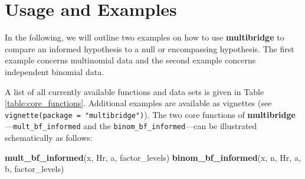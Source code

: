 \documentclass[
  english,
  man,floatsintext]{apa6}
\newenvironment{Shaded}{\begin{snugshade}}{\end{snugshade}}
\newcommand{\KeywordTok}[1]{\textcolor[rgb]{0.13,0.29,0.53}{\textbf{#1}}}
\newcommand{\NormalTok}[1]{#1}
\begin{document}
\hypertarget{usage-and-examples}{%
\section{Usage and Examples}\label{usage-and-examples}}

\noindent In the following, we will outline two examples on how to use \textbf{multibridge} to compare an informed hypothesis to a null or encompassing hypothesis. The first example concerns multinomial data and the second example concerns independent binomial data.

A list of all currently available functions and data sets is given in Table \ref{table:core_functions}. Additional examples are available as vignettes (see \texttt{vignette(package\ =\ "multibridge")}). The two core functions of \textbf{multibridge}---\texttt{mult\_bf\_informed} and the \texttt{binom\_bf\_informed}---can be illustrated schematically as follows:

\begin{Shaded}
\begin{Highlighting}[]
\KeywordTok{mult_bf_informed}\NormalTok{(x, Hr, a, factor_levels)}
\KeywordTok{binom_bf_informed}\NormalTok{(x, n, Hr, a, b, factor_levels)}
\end{Highlighting}
\end{Shaded}
\end{document}
